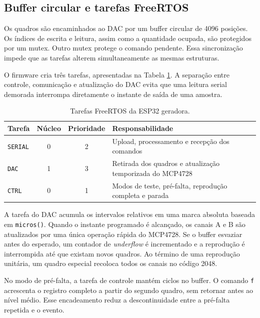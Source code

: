 \subsection{Buffer circular e tarefas FreeRTOS}

Os quadros são encaminhados ao DAC por um buffer circular de 4096 posições. Os índices de escrita e leitura, assim como a quantidade ocupada, são protegidos por um mutex. Outro mutex protege o comando pendente. Essa sincronização impede que as tarefas alterem simultaneamente as mesmas estruturas.

O firmware cria três tarefas, apresentadas na Tabela \ref{tab:tarefas-geradora}. A separação entre controle, comunicação e atualização do DAC evita que uma leitura serial demorada interrompa diretamente o instante de saída de uma amostra.

\begin{table}[H]
  \centering
  \small
  \caption{Tarefas FreeRTOS da ESP32 geradora.}
  \label{tab:tarefas-geradora}
  \begin{tabular}{lccp{6.5cm}}
    \toprule
    Tarefa & Núcleo & Prioridade & Responsabilidade \\
    \midrule
    \texttt{SERIAL} & 0 & 2 & Upload, processamento e recepção dos comandos \\
    \texttt{DAC} & 1 & 3 & Retirada dos quadros e atualização temporizada do MCP4728 \\
    \texttt{CTRL} & 0 & 1 & Modos de teste, pré-falta, reprodução completa e parada \\
    \bottomrule
  \end{tabular}
\end{table}

A tarefa do DAC acumula os intervalos relativos em uma marca absoluta baseada em \texttt{micros()}. Quando o instante programado é alcançado, os canais A e B são atualizados por uma única operação rápida do MCP4728. Se o buffer esvaziar antes do esperado, um contador de \textit{underflow} é incrementado e a reprodução é interrompida até que existam novos quadros. Ao término de uma reprodução unitária, um quadro especial recoloca todos os canais no código 2048.

No modo de pré-falta, a tarefa de controle mantém ciclos no buffer. O comando \texttt{f} acrescenta o registro completo a partir do segundo quadro, sem retornar antes ao nível médio. Esse encadeamento reduz a descontinuidade entre a pré-falta repetida e o evento.

